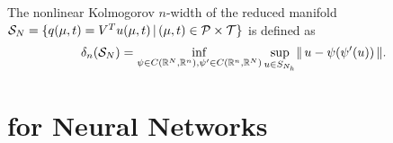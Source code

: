 \begin{definition} \label{def: nonlinear kolmogorov}
    The nonlinear Kolmogorov $n$-width of the reduced manifold $\mathcal{S}_N = \{ q(\mu, t) = V^T u(\mu, t) \, \vert \, (\mu, t) \in \mathcal{P} \times \mathcal{T} \}$ is defined as 
    \begin{equation*}
        \delta_n(\mathcal{S}_N) = \inf\limits_{\psi \in C(\mathbb{R}^N, \mathbb{R}^n), \psi' \in C(\mathbb{R}^n, \mathbb{R}^N)} \sup\limits_{u \in S_{N_h}} \lVert \, u - \psi(\psi'(u)) \, \rVert.
    \end{equation*}
\end{definition}

\section{for Neural Networks} \label{section: background for nn}

